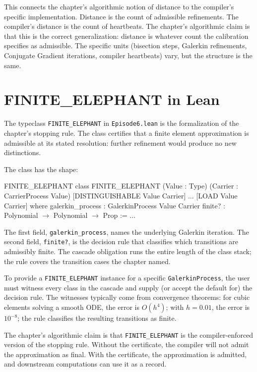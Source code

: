 This connects the chapter's algorithmic notion of distance to the
compiler's specific implementation. Distance is the count of
admissible refinements. The compiler's distance is the count of
heartbeats. The chapter's algorithmic claim is that this is the
correct generalization: distance is whatever count the calibration
specifies as admissible. The specific units (bisection steps,
Galerkin refinements, Conjugate Gradient iterations, compiler
heartbeats) vary, but the structure is the same.

\section{FINITE\_ELEPHANT in Lean}
\label{se:finite-elephant-in-lean}

The typeclass \texttt{FINITE\_ELEPHANT} in \texttt{Episode6.lean} is the
formalization of the chapter's stopping rule. The class certifies that
a finite element approximation is admissible at its stated resolution:
further refinement would produce no new distinctions.

The class has the shape:

\begin{leanexcerpt}{FINITE_ELEPHANT}
class FINITE_ELEPHANT
    (Value : Type)
    (Carrier : CarrierProcess Value)
    [DISTINGUISHABLE Value Carrier] ... [LOAD Value Carrier]
  where
  galerkin_process : GalerkinProcess Value Carrier
  finite?          : Polynomial $\to$ Polynomial $\to$ Prop := ...
\end{leanexcerpt}

The first field, \texttt{galerkin\_process}, names the underlying
Galerkin iteration. The second field, \texttt{finite?}, is the
decision rule that classifies which transitions are admissibly
finite. The cascade obligation runs the entire length of the class
stack; the rule covers the transition cases the chapter named.

To provide a \texttt{FINITE\_ELEPHANT} instance for a specific
\texttt{GalerkinProcess}, the user must witness every class in the
cascade and supply (or accept the default for) the decision rule.
The witnesses typically come from convergence theorems: for cubic
elements solving a smooth ODE, the error is $O(h^4)$; with
$h = 0.01$, the error is $10^{-8}$; the rule classifies the
resulting transitions as finite.

The chapter's algorithmic claim is that \texttt{FINITE\_ELEPHANT} is
the compiler-enforced version of the stopping rule. Without the
certificate, the compiler will not admit the approximation as final.
With the certificate, the approximation is admitted, and downstream
computations can use it as a record.

